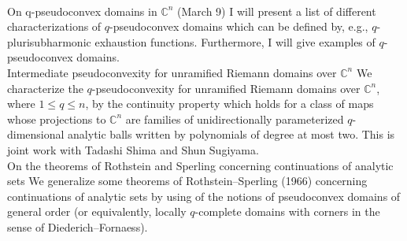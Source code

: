 \documentclass[a4]{article}
\theoremstyle{plain} %
\theoremstyle{definition} %
\begin{document}
\vskip5mm
\\
On q-pseudoconvex domains in $\mathbb{C}^n$  (March 9)
\vskip3mm
I will present a list of different characterizations of $q$-pseudoconvex domains which can be defined by, e.g., $q$-plurisubharmonic exhaustion functions. Furthermore, I will give examples of $q$-pseudoconvex domains. 
\vskip5mm
\\
Intermediate pseudoconvexity for unramified Riemann domains over $\mathbb{C}^n$
\vskip3mm
We characterize the $q$-pseudoconvexity for unramified Riemann domains over $\mathbb{C}^n$,
where $1 \leq q \leq n$, by the continuity property which holds for a class of maps whose
projections to $\mathbb{C}^n$ are families of unidirectionally parameterized $q$-dimensional
analytic balls written by polynomials of degree at most two. 
This is joint work with Tadashi Shima and Shun Sugiyama.
\vskip5mm
\\
On the theorems of Rothstein and Sperling concerning continuations of analytic sets
\vskip3mm
We generalize some theorems of Rothstein--Sperling (1966) concerning continuations of analytic sets by using of the notions of pseudoconvex domains of general order (or equivalently, locally $q$-complete domains with corners in the sense of Diederich--Fornaess). 
\end{document}
